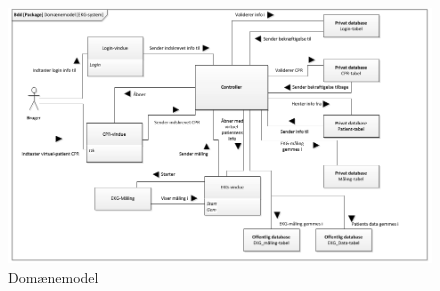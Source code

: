 \begin{figure}[H]
	\centering
	\includegraphics[width=1\textwidth]{Figurer/Snip20150525_18}
	\caption{Domænemodel}
\end{figure}



